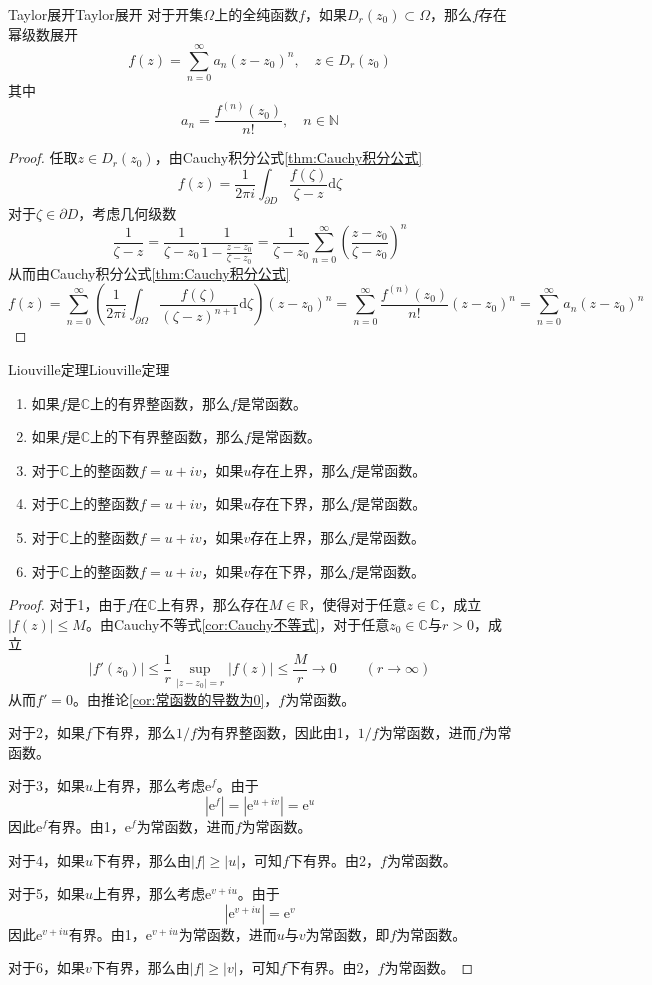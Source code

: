 \documentclass[lang = cn, scheme = chinese, thmcnt = section]{elegantbook}
\newcommand{\N}{\mathbb{N}}            %
\newcommand{\R}{\mathbb{R}}            %
\newcommand{\C}{\mathbb{C}}  		   %
\newcommand{\sub}{\subset}             %
\newcommand{\ee}{\mathrm{e}^}           %
\begin{document}
\begin{theorem}{Taylor展开}{Taylor展开}
	对于开集$\Omega$上的全纯函数$f$，如果$D_r(z_0)\sub\Omega$，那么$f$存在幂级数展开
	$$
	f(z)=\sum_{n=0}^{\infty}{a_n(z-z_0)^n},\quad z\in D_r(z_0)
	$$
	其中
	$$
	a_n=\frac{f^{(n)}(z_0)}{n!},\quad n\in\N
	$$
\end{theorem}

\begin{proof}
	任取$z\in D_r(z_0)$，由Cauchy积分公式\ref{thm:Cauchy积分公式}
	$$
	f(z)=\frac{1}{2\pi i}\int_{\partial  D}{\frac{f(\zeta)}{\zeta-z}\mathrm{d}\zeta}
	$$
	对于$\zeta\in \partial D$，考虑几何级数%
	$$
	\frac{1}{\zeta-z}
	=\frac{1}{\zeta-z_0}\frac{1}{1-\frac{z-z_0}{\zeta-z_0}}
	=\frac{1}{\zeta-z_0}\sum_{n=0}^{\infty}\left(\frac{z-z_0}{\zeta-z_0}\right)^n
	$$
	从而由Cauchy积分公式\ref{thm:Cauchy积分公式}
	$$
	f(z)
	=\sum_{n=0}^{\infty}{\left(\frac{1}{2\pi i}\int_{\partial\Omega}{\frac{f(\zeta)}{(\zeta-z)^{n+1}}\mathrm{d}\zeta}\right)(z-z_0)^n}
	=\sum_{n=0}^{\infty}{\frac{f^{(n)}(z_0)}{n!}(z-z_0)^n}
	=\sum_{n=0}^{\infty}{a_n(z-z_0)^n}
	$$
\end{proof}

\begin{corollary}{Liouville定理}{Liouville定理}
	\begin{enumerate}
		\item 如果$f$是$\C$上的有界整函数，那么$f$是常函数。
		\item 如果$f$是$\C$上的下有界整函数，那么$f$是常函数。
		\item 对于$\C$上的整函数$f=u+iv$，如果$u$存在上界，那么$f$是常函数。
		\item 对于$\C$上的整函数$f=u+iv$，如果$u$存在下界，那么$f$是常函数。
		\item 对于$\C$上的整函数$f=u+iv$，如果$v$存在上界，那么$f$是常函数。
		\item 对于$\C$上的整函数$f=u+iv$，如果$v$存在下界，那么$f$是常函数。
	\end{enumerate}
\end{corollary}

\begin{proof}
	对于1，由于$f$在$\C$上有界，那么存在$M\in\R$，使得对于任意$z\in\C$，成立$|f(z)| \le M$。由Cauchy不等式\ref{cor:Cauchy不等式}，对于任意$z_0\in\C$与$r>0$，成立
	$$
	|f'(z_0)| \le \frac{1}{r}\sup_{|z-z_0|=r}|f(z)|
	\le\frac{M}{r}\to 0\qquad (r\to \infty)
	$$
	从而$f'=0$。由推论\ref{cor:常函数的导数为0}，$f$为常函数。
	
	对于2，如果$f$下有界，那么$1/f$为有界整函数，因此由1，$1/f$为常函数，进而$f$为常函数。
	
	对于3，如果$u$上有界，那么考虑$\ee{f}$。由于
	$$
	|\ee{f}|=|\ee{u+iv}|=\ee{u}
	$$
	因此$\ee{f}$有界。由1，$\ee{f}$为常函数，进而$f$为常函数。
	
	对于4，如果$u$下有界，那么由$|f|\ge |u|$，可知$f$下有界。由2，$f$为常函数。
	
	对于5，如果$u$上有界，那么考虑$\ee{v+iu}$。由于
	$$
	|\ee{v+iu}|=\ee{v}
	$$
	因此$\ee{v+iu}$有界。由1，$\ee{v+iu}$为常函数，进而$u$与$v$为常函数，即$f$为常函数。
	
	对于6，如果$v$下有界，那么由$|f|\ge |v|$，可知$f$下有界。由2，$f$为常函数。
\end{proof}
\end{document}
